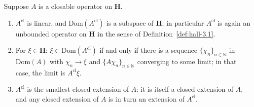 \begin{proposition}
    \label{prpstn:closure-linearity-and-sequential-description}
    \leanok
    Suppose $A$ is a closable operator on $\mathbf{H}$.
    \begin{enumerate}
        \item $A^{\text{cl}}$ is linear, and $\text{Dom}(A^{\text{cl}})$ is a subspace of $\mathbf{H}$; in particular $A^{\text{cl}}$ is again an unbounded operator on $\mathbf{H}$ in the sense of Definition~\ref{def:hall-3.1}.
        \item For $\xi \in \mathbf{H}$: $\xi \in \text{Dom}(A^{\text{cl}})$ if and only if there is a sequence $\{ \chi_n \}_{n \in \mathbb{N}}$ in $\text{Dom}(A)$ with $\chi_n \to \xi$ and $\{ A\chi_n \}_{n \in \mathbb{N}}$ converging to some limit; in that case, the limit is $A^{\text{cl}}\xi$.
        \item $A^{\text{cl}}$ is the smallest closed extension of $A$: it is itself a closed extension of $A$, and any closed extension of $A$ is in turn an extension of $A^{\text{cl}}$.
    \end{enumerate}
\end{proposition}
